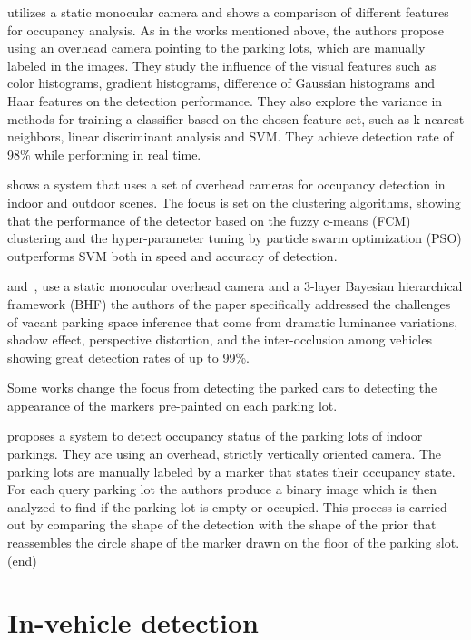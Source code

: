 \citet{tschentscher} utilizes a static monocular camera and shows a comparison
of different features for occupancy analysis. As in the works mentioned above,
the authors propose using an overhead camera pointing to the parking lots,
which are manually labeled in the images. They study the influence of the
visual features such as color histograms, gradient histograms, difference of
Gaussian histograms and Haar features on the detection performance. They also
explore the variance in methods for training a classifier based on the chosen
feature set, such as k-nearest neighbors, linear discriminant analysis and
SVM\@. They achieve detection rate of 98\% while performing in real time.

\citet{ichihashi} shows a system that uses a set of overhead cameras for
occupancy detection in indoor and outdoor scenes. The focus is set on the
clustering algorithms, showing that the performance of the detector based on
the fuzzy c-means (FCM) clustering and the hyper-parameter tuning by particle
swarm optimization (PSO) outperforms SVM both in speed and accuracy of
detection.

\citet{chingchun10} and~\citet{chingjao10}, use a static monocular overhead
camera and a 3-layer Bayesian hierarchical framework  (BHF) the authors of the
paper specifically addressed the challenges of vacant parking space inference
that come from dramatic luminance variations, shadow effect, perspective
distortion, and the inter-occlusion among vehicles showing great detection
rates of up to 99\%.

Some works change the focus from detecting the parked cars to detecting the
appearance of the markers pre-painted on each parking lot.

\citet{yusnita12} proposes a system to detect occupancy status of the parking
lots of indoor parkings. They are using an overhead, strictly vertically
oriented camera. The parking lots are manually labeled by a marker that states
their occupancy state. For each query parking lot the authors produce a binary
image which is then analyzed to find if the parking lot is empty or occupied.
This process is carried out by comparing the shape of the detection with the
shape of the prior that reassembles the circle shape of the marker drawn on
the floor of the parking slot. %
(end)

\section{In-vehicle detection} %
\label{sec:in_vehicle_detection}

